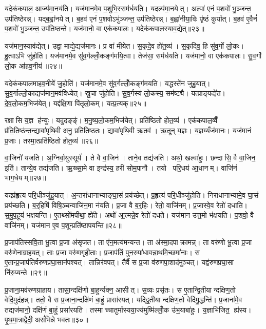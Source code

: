 यदेक॑कपाल॒ आज्य॑मा॒नय॑ति। यज॑मानमे॒व प॒शुभि॒स्सम॑र्धयति। यदल्प॑मा॒नयेत्। अल्पा॑ एनं प॒शवो॑ भु॒ञ्जन्त॒ उप॑तिष्ठेरन्न्। यद्ब॒ह्वा॑नयेत्। ब॒हव॑ एनं प॒शवोऽभु॑ञ्जन्त॒ उप॑तिष्ठेरन्न्। ब॒ह्वा॑नीया॒विः पृ॑ष्ठं कुर्यात्। ब॒हव॑ ए॒वैनं॑ प॒शवो॑ भु॒ञ्जन्त॒ उप॑तिष्ठन्ते। यज॑मानो॒ वा एक॑कपालः। यदेक॑कपालस्याव॒द्येत्॥२३॥

यज॑मान॒स्याव॑द्येत्। उद्वा॒ माद्ये॒द्यज॑मानः। प्र वा॑ मीयेत। स॒कृदे॒व हो॑त॒व्य॑। स॒कृदि॑व॒ हि सु॑व॒र्गो लो॒कः। हु॒त्वाऽभि जु॑होति। यज॑मानमे॒व सु॑व॒र्गल्लोँ॒कङ्ग॑मयि॒त्वा। तेज॑सा॒ सम॑र्धयति। यज॑मानो॒ वा एक॑कपालः। सु॒व॒र्गो लो॒क आ॑हव॒नीय॑॥२४॥

यदेक॑कपालमाहव॒नीये॑ जु॒होति॑। यज॑मानमे॒व सु॑व॒र्गल्लोँ॒कङ्ग॑मयति। यद्धस्ते॑न जुहु॒यात्। सु॒व॒र्गाल्लो॒काद्यज॑मान॒मव॑विध्येत्। स्रु॒चा जु॑होति। सु॒व॒र्गस्य॑ लो॒कस्य॒ सम॑ष्ट्यै। यत्प्राङ्पद्ये॑त। दे॒व॒लो॒कम॒भिज॑येत्। यद्द॑क्षि॒णा पि॑तृलो॒कम्। यत्प्र॒त्यक्॥२५॥

रक्षासि य॒ज्ञ ह॑न्युः। यदुदङ्ङ्॑। म॒नु॒ष्य॒लो॒कम॒भिज॑येत्। प्रति॑ष्ठितो होत॒व्य॑। एक॑कपाल॒व्वैँ प्र॑ति॒तिष्ठ॑न्त॒न्द्यावा॑पृथि॒वी अनु॒ प्रति॑तिष्ठतः। द्यावा॑पृथि॒वी ऋ॒तव॑। ऋ॒तून् य॒ज्ञः। य॒ज्ञय्यँज॑मानः। यज॑मानं प्र॒जाः। तस्मा॒त्प्रति॑ष्ठितो होत॒व्य॑॥२६॥

वा॒जिनो॑ यजति। अ॒ग्निर्वा॒युस्सूर्य॑। ते वै वा॒जिन॑। ताने॒व तद्य॑जति। अथो॒ खल्वा॑हुः। छन्दासि॒ वै वा॒जिन॒ इति॑। तान्ये॒व तद्य॑जति। ऋ॒ख्सा॒मे वा इन्द्र॑स्य॒ हरी॑ सोम॒पानौ। तयो परि॒धय॑ आ॒धानम्। वाजि॑नं भाग॒धेयम्॥२७॥

यदप्र॑हृत्य परि॒धीञ्जु॑हु॒यात्। अ॒न्तरा॑धानाभ्याङ्घा॒सं प्रय॑च्छेत्। प्र॒हृत्य॑ परि॒धीञ्जु॑होति। निरा॑धानाभ्यामे॒व घा॒सं प्रय॑च्छति। ब॒र्॒हिषि॑ विषि॒ञ्चन्वाजि॑न॒मा न॑यति। प्र॒जा वै ब॒र्॒हिः। रेतो॒ वाजि॑नम्। प्र॒जास्वे॒व रेतो॑ दधाति। स॒मु॒प॒हूय॑ भक्षयन्ति। ए॒तथ्सो॑मपीथा॒ ह्ये॑ते। अथो॑ आ॒त्मन्ने॒व रेतो॑ दधते। यज॑मान उत्त॒मो भ॑क्षयति। प॒शवो॒ वै वाजि॑नम्। यज॑मान ए॒व प॒शून्प्रति॑ष्ठापयन्ति॥२८॥\anuvakamend[लो॒को ब॑हुरू॒पं भ॑व॒त्याज्य॑भागौ प॒शव॒ आज्य॑मव॒द्येदा॑हव॒नीय॑ प्र॒त्यक्तस्मा॒त्प्रति॑ष्ठितो होत॒व्यो॑ भाग॒धेय॑मे॒ते च॒त्वारि॑ च]

प्र॒जाप॑तिस्सवि॒ता भू॒त्वा प्र॒जा अ॑सृजत। ता ए॑न॒मत्य॑मन्यन्त। ता अ॑स्मा॒दपाक्रामन्न्। ता वरु॑णो भू॒त्वा प्र॒जा वरु॑णेनाग्राहयत्। ताः प्र॒जा वरु॑णगृहीताः। प्र॒जाप॑तिं॒ पुन॒रुपा॑धावन्ना॒थमि॒च्छमा॑नाः। स ए॒तान्प्र॒जाप॑तिर्वरुणप्रघा॒सान॑पश्यत्। तान्निर॑वपत्। तैर्वै स प्र॒जा व॑रुणपा॒शाद॑मुञ्चत्। यद्व॑रुणप्रघा॒सा नि॑रु॒प्यन्ते॥२९॥

प्र॒जाना॒मव॑रुणग्राहाय। तासा॒न्दक्षि॑णो बा॒हुर्न्य॑क्न॒ आसीत्। स॒व्यः प्रसृ॑तः। स ए॒तान्द्वि॒तीयान्दक्षिण॒तो वेदि॒मुद॑हन्न्। ततो॒ वै स प्र॒जाना॒न्दक्षि॑णं बा॒हुं प्रासा॑रयत्। यद्द्वि॒तीयान्दक्षिण॒तो वेदि॑मु॒द्धन्ति॑। प्र॒जाना॑मे॒व तद्यज॑मानो॒ दक्षि॑णं बा॒हुं प्रसा॑रयति। तस्माच्चातुर्मास्यया॒ज्य॑मुष्मि॑ल्लोँ॒क उ॑भ॒याबा॑हुः। य॒ज्ञाभि॑जित॒ ह्य॑स्य। पृ॒थ॒मा॒त्राद्वैदी॒ असं॑भिन्ने भवतः॥३०॥

